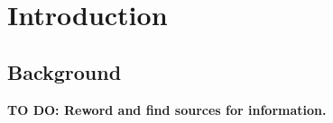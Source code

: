 
\section{Introduction}
\subsection{Background}
\textbf{TO DO: Reword and find sources for information.}


